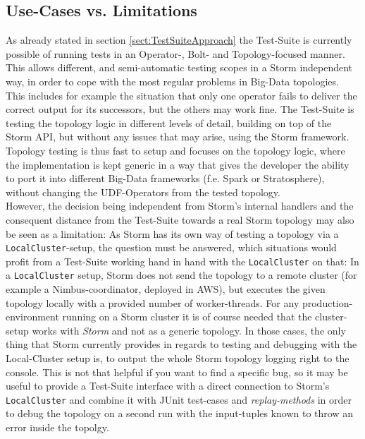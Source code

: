 \subsection{Use-Cases vs. Limitations}
\label{sect:TestSuiteUseCases}
	As already stated in section \ref{sect:TestSuiteApproach} the Test-Suite is currently possible of running tests in an Operator-, Bolt- and Topology-focused manner. This allows different, and semi-automatic testing scopes in a Storm independent way, in order to cope with the most regular problems in Big-Data topologies. This includes for example the situation that only one operator fails to deliver the correct output for its successors, but the others may work fine. The Test-Suite is testing the topology logic in different levels of detail, building on top of the Storm API, but without any issues that may arise, using the Storm framework. Topology testing is thus fast to setup and focuses on the topology logic, where the implementation is kept generic in a way that gives the developer the ability to port it into different Big-Data frameworks (f.e. Spark or Stratosphere), without changing the UDF-Operators from the tested topology. \\ %

	However, the decision being independent from Storm's internal handlers and the consequent distance from the Test-Suite towards a real Storm topology may also be seen as a limitation: As Storm has its own way of testing a topology via a \texttt{LocalCluster}-setup, the question must be answered, which situations would profit from a Test-Suite working hand in hand with the \texttt{LocalCluster} on that: In a \texttt{LocalCluster} setup, Storm does not send the topology to a remote cluster (for example a Nimbus-coordinator, deployed in AWS), but executes the given topology locally with a provided number of worker-threads. For any production-environment running on a Storm cluster it is of course needed that the cluster-setup works with \textit{Storm} and not as a generic topology. In those cases, the only thing that Storm currently provides in regards to testing and debugging with the Local-Cluster setup is, to output the whole Storm topology logging right to the console. This is not that helpful if you want to find a specific bug, so it may be useful to provide a Test-Suite interface with a direct connection to Storm's \texttt{LocalCluster} and combine it with JUnit test-cases and \textit{replay-methods} in order to debug the topology on a second run with the input-tuples known to throw an error inside the topolgy.
	